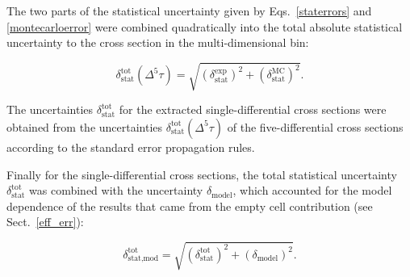 \documentclass[prc,twocolumn,superscriptaddress,showpacs,amssymb,amsmath,amsfonts,aps,nofootinbib]{revtex4-1}
\begin{document}
The two parts of the statistical uncertainty given by Eqs.~\eqref{staterrors} and \eqref{montecarloerror} were combined quadratically into the total absolute statistical uncertainty to the cross section in the multi-dimensional bin:


\begin{equation}
\delta_{\text{stat}}^{\text{tot}}(\Delta^{5} \tau) =
\sqrt{\left (\delta_{\text{stat}}^{\text{exp}} \right )^{2} + \left (\delta_{\text{stat}}^{\text{MC}}\right )^{2}}.
\label{errortot}
\end{equation}

The uncertainties $\delta_{\text{stat}}^{\text{tot}}$ for the extracted  single-differential cross sections were obtained from the uncertainties  $\delta_{\text{stat}}^{\text{tot}}(\Delta^{5} \tau)$ of the five-differential cross sections according to the standard error propagation rules.


Finally for the single-differential cross sections, the total statistical uncertainty $\delta_{\text{stat}}^{\text{tot}}$ was  combined with the uncertainty $\delta_{\text{model}}$, which accounted for the model dependence of the results that came from the empty cell contribution (see Sect.~\ref{eff_err}):

\begin{equation}
\delta_{\text{stat,mod}}^{\text{tot}} =
\sqrt{\left (\delta_{\text{stat}}^{\text{tot}} \right )^{2} + \left (\delta_{\text{model}}\right )^{2}}.
\label{eq:error_stat_mod}
\end{equation}



\end{document}

